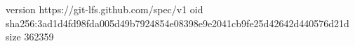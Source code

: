 version https://git-lfs.github.com/spec/v1
oid sha256:3ad1d4fd98fda005d49b7924854e08398e9e2041cb9fe25d42642d440576d21d
size 362359
